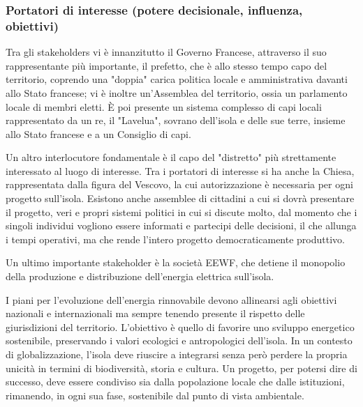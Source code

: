 \documentclass[fleqn,11pt]{SelfArx} %
\begin{document}
\subsubsection{Portatori di interesse (potere decisionale, influenza, obiettivi)}
Tra gli stakeholders vi è innanzitutto il Governo Francese, attraverso il suo rappresentante più importante, il prefetto, che è allo stesso tempo capo del territorio, coprendo una "doppia" carica politica locale e amministrativa davanti allo Stato francese; vi è inoltre un'Assemblea del territorio, ossia un parlamento locale di membri eletti. 
È poi presente un sistema complesso di capi locali rappresentato da un re, il "Lavelua", sovrano dell'isola e delle sue terre, insieme allo Stato francese e a un Consiglio di capi.

Un altro interlocutore fondamentale è il capo del "distretto" più strettamente interessato al luogo di interesse. 
Tra i portatori di interesse si ha anche la Chiesa, rappresentata dalla figura del Vescovo, la cui autorizzazione è necessaria per ogni progetto sull'isola.
Esistono anche assemblee di cittadini a cui si dovrà presentare il progetto, veri e propri sistemi politici in cui si discute molto, dal momento che i singoli individui vogliono essere informati e partecipi delle decisioni, il che allunga i tempi operativi, ma che rende l'intero progetto democraticamente produttivo.

Un ultimo importante stakeholder è la società EEWF, che detiene il monopolio della produzione e distribuzione dell'energia elettrica sull'isola.

I piani per l'evoluzione dell'energia rinnovabile devono allinearsi agli obiettivi nazionali e internazionali ma sempre tenendo presente il rispetto delle giurisdizioni del territorio.
L'obiettivo è quello di favorire uno sviluppo energetico sostenibile, preservando i valori ecologici e antropologici dell'isola. 
In un contesto di globalizzazione, l'isola deve riuscire a integrarsi senza però perdere la propria unicità in termini di biodiversità, storia e cultura. 
Un progetto, per potersi dire di successo, deve essere condiviso sia dalla popolazione locale che dalle istituzioni, rimanendo, in ogni sua fase, sostenibile dal punto di vista ambientale. 
\end{document}
